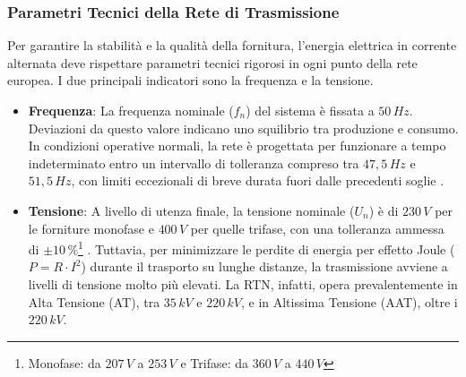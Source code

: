 











\subsubsection{Parametri Tecnici della Rete di Trasmissione}

Per garantire la stabilità e la qualità della fornitura, l'energia elettrica in corrente alternata deve rispettare parametri tecnici rigorosi in ogni punto della rete europea. I due principali indicatori sono la frequenza e la tensione.


\begin{itemize}
    \item \textbf{Frequenza}: La frequenza nominale ($f_n$) del sistema è fissata a $50\,Hz$. Deviazioni da questo valore indicano uno squilibrio tra produzione e consumo. In condizioni operative normali, la rete è progettata per funzionare a tempo indeterminato entro un intervallo di tolleranza compreso tra $47,5\,Hz$ e $51,5\,Hz$, con limiti eccezionali di breve durata fuori dalle precedenti soglie \cite{Fase-di-rete-terna} \cite{EN-50160}.
    \item \textbf{Tensione}: A livello di utenza finale, la tensione nominale ($U_n$) è di $230\,V$ per le forniture monofase e $400\,V$ per quelle trifase, con una tolleranza ammessa di $\pm 10\,\%$\footnote{Monofase: da $207\,V$ a $253\,V$ e Trifase: da $360\,V$ a $440\,V$} \cite{CEI0-21}. Tuttavia, per minimizzare le perdite di energia per effetto Joule ($P = R \cdot I^2$) durante il trasporto su lunghe distanze, la trasmissione avviene a livelli di tensione molto più elevati. 
    La RTN, infatti, opera prevalentemente in Alta Tensione (AT), tra $35\,kV$ e $220\,kV$, e in Altissima Tensione (AAT), oltre i $220\,kV$\cite{alta-tensione-parametri}.
\end{itemize}



